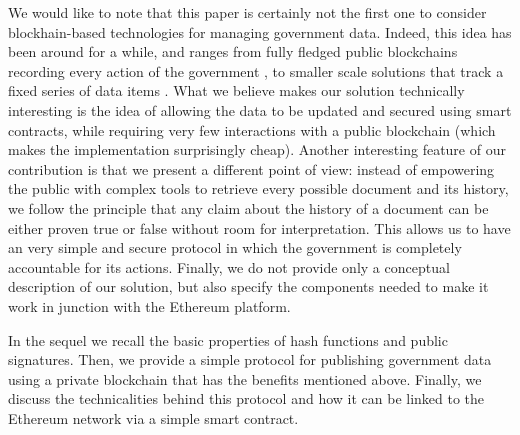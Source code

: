 We would like to note that this paper is certainly not the first one to consider blockhain-based technologies for managing government data. Indeed, this idea has been around for a while, and ranges from fully fledged public blockchains recording every action of the government \cite{eushit,ibmshit}, to smaller scale solutions that track a fixed series of data items \cite{energiaabierta}. What we believe makes our solution technically interesting is the idea of allowing the data to be updated and secured using smart contracts, while requiring very few interactions with a public blockchain (which makes the implementation surprisingly cheap). Another interesting feature of our contribution is that we present a different point of view: instead of empowering the public with complex tools to retrieve every possible document and its history, we follow the principle that any claim about the history of a document can be either proven true or false without room for interpretation. This allows us to have an very simple and secure protocol in which the government is completely accountable for its actions. Finally, we do not provide only a conceptual description of our solution, but also specify the components needed to make it work in junction with the Ethereum platform.

In the sequel we recall the basic properties of hash functions and public signatures. Then, we provide a simple protocol for publishing government data using a private blockchain that has the benefits mentioned above. Finally, we discuss the technicalities behind this protocol and how it can be linked to the Ethereum network via a simple smart contract.
